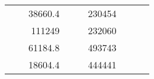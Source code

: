 \begin{table}[H]
\begin{tabular}{|ccrccrccc}
\multicolumn{1}{|c|}{\cellcolor[HTML]{FFFFC7}}                                & \multicolumn{1}{c|}{\cellcolor[HTML]{DAE8FC}}                      & \multicolumn{1}{r|}{\cellcolor[HTML]{DAE8FC}38660.4}   & \multicolumn{1}{c|}{\cellcolor[HTML]{FFFFC7}}                                & \multicolumn{1}{c|}{\cellcolor[HTML]{DAE8FC}}                       & \multicolumn{1}{r|}{\cellcolor[HTML]{DDFDFF}230454}    &                                                                              &                                                                    &                                                        \\ \cline{3-3} \cline{6-6}
\multicolumn{1}{|c|}{\cellcolor[HTML]{FFFFC7}}                                & \multicolumn{1}{c|}{\cellcolor[HTML]{DAE8FC}}                      & \multicolumn{1}{r|}{\cellcolor[HTML]{DDFDFF}111249}    & \multicolumn{1}{c|}{\cellcolor[HTML]{FFFFC7}}                                & \multicolumn{1}{c|}{\cellcolor[HTML]{DAE8FC}}                       & \multicolumn{1}{r|}{\cellcolor[HTML]{DAE8FC}232060}    &                                                                              &                                                                    &                                                        \\ \cline{3-3} \cline{6-6}
\multicolumn{1}{|c|}{\cellcolor[HTML]{FFFFC7}}                                & \multicolumn{1}{c|}{\cellcolor[HTML]{DAE8FC}}                      & \multicolumn{1}{r|}{\cellcolor[HTML]{DAE8FC}61184.8}   & \multicolumn{1}{c|}{\cellcolor[HTML]{FFFFC7}}                                & \multicolumn{1}{c|}{\cellcolor[HTML]{DAE8FC}}                       & \multicolumn{1}{r|}{\cellcolor[HTML]{DDFDFF}493743}    &                                                                              &                                                                    &                                                        \\ \cline{3-3} \cline{6-6}
\multicolumn{1}{|c|}{\cellcolor[HTML]{FFFFC7}}                                & \multicolumn{1}{c|}{\cellcolor[HTML]{DAE8FC}}                      & \multicolumn{1}{r|}{\cellcolor[HTML]{DDFDFF}18604.4}   & \multicolumn{1}{c|}{\cellcolor[HTML]{FFFFC7}}                                & \multicolumn{1}{c|}{\cellcolor[HTML]{DAE8FC}}                       & \multicolumn{1}{r|}{\cellcolor[HTML]{DAE8FC}444441}    &                                                                              &                                                                    &                                                        \\ \cline{3-3} \cline{6-6}

\end{tabular}
\end{table}
